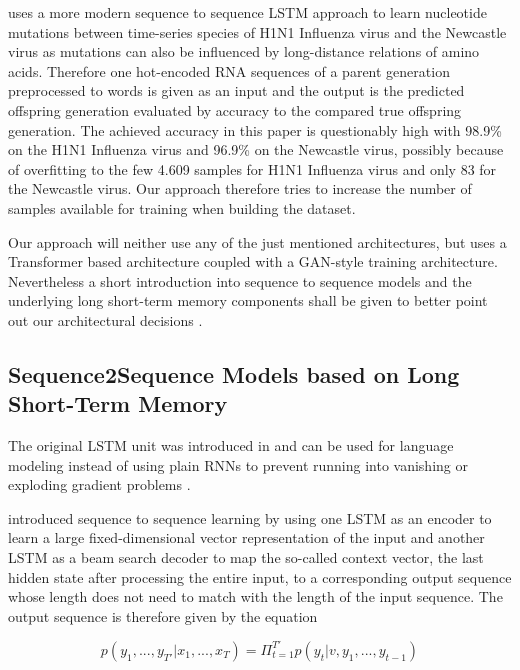 \cite{Mohamed2021} uses a more modern sequence to sequence  \ac{LSTM} approach to learn nucleotide mutations between time-series species of H1N1 Influenza virus and the Newcastle virus as mutations can also be influenced by long-distance relations of amino acids. Therefore one hot-encoded RNA sequences of a parent generation preprocessed to words is given as an input and the output is the predicted offspring generation evaluated by accuracy to the compared true offspring generation. The achieved accuracy in this paper is questionably high with 98.9\% on the H1N1 Influenza virus and 96.9\% on the Newcastle virus, possibly because of overfitting to the few 4.609 samples for H1N1 Influenza virus and only 83 for the Newcastle virus. Our approach therefore tries to increase the number of samples available for training when building the dataset. 

Our approach will neither use any of the just mentioned architectures, but uses a Transformer based architecture coupled with a GAN-style training architecture. Nevertheless a short introduction into sequence to sequence models and the underlying long short-term memory components shall be given to better point out our architectural decisions . 

\subsection{Sequence2Sequence Models based on Long Short-Term Memory} \label{fundamentalsE}


The original \ac{LSTM} unit was introduced in \cite{Hochreiter1997} and can be used for language modeling instead of using plain \acp{RNN} to prevent running into vanishing or exploding gradient problems \cite{Sundermeyer2012}. 



\cite{Sutskever2014} introduced sequence to sequence learning by using one \ac{LSTM} as an encoder to learn a large fixed-dimensional vector representation of the input and another \ac{LSTM} as a beam search decoder to map the so-called context vector, the last hidden state after processing the entire input, to a corresponding output sequence whose length does not need to match with the length of the input sequence. The output sequence is therefore given by the equation

\begin{equation}
	p(y_1, ..., y_{T'} | x_1, ..., x_{T}) = \Pi_{t=1}^{T'} p(y_t | v, y_1, ..., y_{t-1})
\end{equation}

